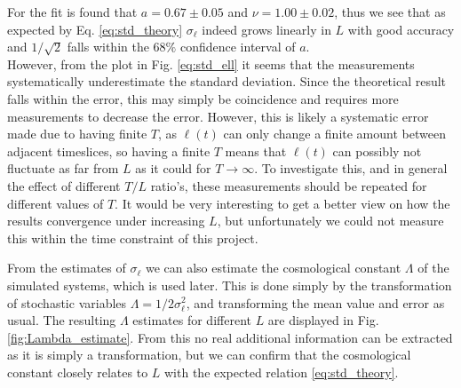 For the fit is found that $a = 0.67 \pm 0.05$ and $\nu = 1.00 \pm 0.02$, thus we see that as expected by Eq. \eqref{eq:std_theory} $\sigma_\ell$ indeed grows linearly in $L$ with good accuracy and $1/\sqrt{2}$ falls within the $68\%$ confidence interval of $a$. \\
However, from the plot in Fig. \ref{eq:std_ell} it seems that the measurements systematically underestimate the standard deviation.
Since the theoretical result falls within the error, this may simply be coincidence and requires more measurements to decrease the error.
However, this is likely a systematic error made due to having finite $T$, as $\ell(t)$ can only change a finite amount between adjacent timeslices, so having a finite $T$ means that $\ell(t)$ can possibly not fluctuate as far from $L$ as it could for $T \rightarrow \infty$.
To investigate this, and in general the effect of different $T/L$ ratio's, these measurements should be repeated for different values of $T$.
It would be very interesting to get a better view on how the results convergence under increasing $L$, but unfortunately we could not measure this within the time constraint of this project.

From the estimates of $\sigma_\ell$ we can also estimate the cosmological constant $\Lambda$ of the simulated systems, which is used later. This is done simply by the transformation of stochastic variables $\Lambda = 1/2\sigma_\ell^2$, and transforming the mean value and error as usual.
The resulting $\Lambda$ estimates for different $L$ are displayed in Fig. \ref{fig:Lambda_estimate}. From this no real additional information can be extracted as it is simply a transformation, but we can confirm that the cosmological constant closely relates to $L$ with the expected relation \eqref{eq:std_theory}.



